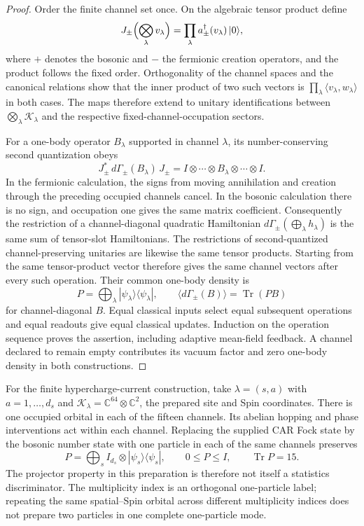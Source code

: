 \begin{proof}
Order the finite channel set once. On the algebraic tensor product define
\[
 J_\pm\Bigl(\bigotimes_\lambda v_\lambda\Bigr)
   =\prod_\lambda a_\pm^\dagger(v_\lambda)\,|0\rangle,
\]
where $+$ denotes the bosonic and $-$ the fermionic creation operators,
and the product follows the fixed order. Orthogonality of the channel
spaces and the canonical relations show that the inner product of two
such vectors is $\prod_\lambda\langle v_\lambda,w_\lambda\rangle$
in both cases. The maps therefore extend to unitary identifications
between $\bigotimes_\lambda\mathcal K_\lambda$ and the respective
fixed-channel-occupation sectors.

For a one-body operator $B_\lambda$ supported in channel $\lambda$,
its number-conserving second quantization obeys
\[
 J_\pm^*\,d\Gamma_\pm(B_\lambda)\,J_\pm
  = I\otimes\cdots\otimes B_\lambda\otimes\cdots\otimes I.
\]
In the fermionic calculation, the signs from moving annihilation and
creation through the preceding occupied channels cancel. In the bosonic
calculation there is no sign, and occupation one gives the same matrix
coefficient. Consequently the restriction of a channel-diagonal
quadratic Hamiltonian $d\Gamma_\pm(\bigoplus_\lambda h_\lambda)$
is the same sum of tensor-slot Hamiltonians. The restrictions of
second-quantized channel-preserving unitaries are likewise the same
tensor products. Starting from the same tensor-product vector therefore
gives the same channel vectors after every such operation. Their common
one-body density is
\[
 P=\bigoplus_\lambda
       |\psi_\lambda\rangle\langle\psi_\lambda|,
 \qquad
 \langle d\Gamma_\pm(B)\rangle=\operatorname{Tr}(PB)
\]
for channel-diagonal $B$. Equal classical inputs select equal subsequent
operations and equal readouts give equal classical updates. Induction on
the operation sequence proves the assertion, including adaptive
mean-field feedback. A channel declared to remain empty contributes its
vacuum factor and zero one-body density in both constructions.
\end{proof}

For the finite hypercharge-current construction, take
$\lambda=(s,a)$ with $a=1,\ldots,d_s$ and
$\mathcal K_\lambda=\mathbb C^{64}\otimes\mathbb C^2$, the prepared
site and Spin coordinates. There is one occupied orbital in each of the
fifteen channels. Its abelian hopping and phase interventions act within
each channel. Replacing the supplied CAR Fock state by the bosonic number
state with one particle in each of the same channels preserves
\[
 P=\bigoplus_s I_{d_s}\otimes
       |\psi_s\rangle\langle\psi_s|,
 \qquad 0\leq P\leq I,\qquad \operatorname{Tr}P=15.
\]
The projector property in this preparation is therefore not itself a
statistics discriminator. The multiplicity index is an orthogonal
one-particle label; repeating the same spatial--Spin orbital across
different multiplicity indices does not prepare two particles in one
complete one-particle mode.


